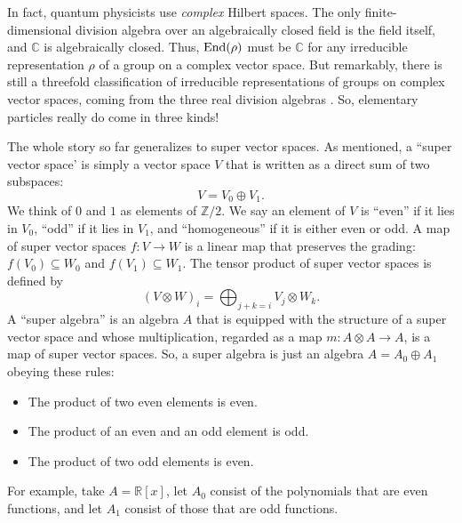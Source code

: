 \documentclass[]{amsart}
\newcommand{\maps}{\colon}    %
\newcommand{\Z}{{\mathbb Z}}  %
\newcommand{\R}{{\mathbb R}}  %
\newcommand{\C}{{\mathbb C}}  %
\renewcommand{\H}{{\mathbb H}}  %
\newcommand{\End}{{\rm End}}
\theoremstyle{definition}
\begin{document}
In fact, quantum physicists use \emph{complex} Hilbert spaces. The only finite-dimensional division algebra over an algebraically closed field is the field itself, and $\C$ is algebraically closed.  Thus, $\End(\rho)$ must be $\C$ for any irreducible representation $\rho$ of a group on a complex vector space.   But remarkably, there is still a threefold classification of irreducible representations of groups on complex vector spaces, coming from the three real division algebras \cite{Baez}.  So, elementary particles really do come in three kinds!

The whole story so far generalizes to super vector spaces.  As mentioned, a ``super vector space' is simply a vector space $V$ that is written as a direct sum of two subspaces:
\[     V = V_0 \oplus V_1 .\]
We think of $0$ and $1$ as elements of $\Z/2$.  We say an element of $V$ is ``even'' if it lies in $V_0$, ``odd'' if it lies in $V_1$, and ``homogeneous'' if it is either even or odd.     A map of super vector spaces $f \maps V \to W$ is a linear map that preserves the grading: $f(V_0) \subseteq W_0$ and $f(V_1) \subseteq W_1$.  The tensor product of super vector spaces is defined by
\[    (V \otimes W)_i = \bigoplus_{j+k = i} V_j \otimes W_k .\] 
A ``super algebra'' is an algebra $A$ that is equipped with the structure of a super
vector space and whose multiplication, regarded as a map $m \maps A \otimes A \to A$, is a
map of super vector spaces.   So, a super algebra is just an algebra $A = A_0 \oplus A_1$ obeying these rules:
\begin{itemize}
\item The product of two even elements is even.
\item The product of an even and an odd element is odd.
\item The product of two odd elements is even.
\end{itemize}
For example, take $A = \R[x]$, let $A_0$ consist of the polynomials that are even functions,
and let $A_1$ consist of those that are odd functions.
\end{document}
